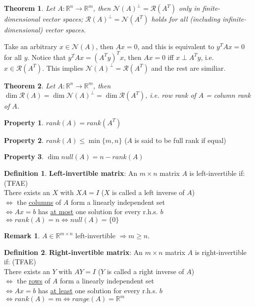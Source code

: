 \documentclass[10pt]{article}
\def\R{\mathbb{R}}
\def\imp{\Rightarrow}
\def\goes{\rightarrow}
\newtheorem{thm}{Theorem}[section]
\theoremstyle{definition}
\newtheorem{defn}{Definition}[section]
\newtheorem{pty}{Property}[section]
\newtheorem{remark}{Remark}[section]
\begin{document}
\begin{thm}
	Let $A: \R^n \goes \R^m$, then $\mathcal{N}(A)^{\perp} = \mathcal{R}(A^T)$ only in finite-dimensional vector spaces;
	$\mathcal{R}(A)^{\perp} = \mathcal{N}(A^T)$ holds for all (including infinite-dimensional) vector spaces.
\end{thm}
\proof
Take an arbitrary $x \in \mathcal{N}(A)$, then $Ax = 0$, and this is equivalent to $y^TAx=0$ for all $y$.
Notice that $y^TAx = (A^Ty)^Tx$, then $Ax = 0$ iff $x \perp A^Ty$, i.e. $x \in \mathcal{R}(A^T)$.
This implies $\mathcal{N}(A)^{\perp} = \mathcal{R}(A^T)$ and the rest are similiar.
\qedhere

\begin{thm}
	Let $A: \R^n \goes \R^m$, then $\dim \mathcal{R}(A) = \dim \mathcal{N}(A)^{\perp} = \dim \mathcal{R}(A^T)$,
	i.e. row rank of $A$ = column rank of $A$.
\end{thm}

\begin{pty}
	$rank(A) = rank(A^T)$
\end{pty}

\begin{pty}
	$rank(A) \le \min\{m,n\}$ ($A$ is said to be full rank if equal)
\end{pty}

\begin{pty}
	$\dim null(A) = n - rank(A)$
\end{pty}


\begin{defn} \textbf{Left-invertible matrix}:
	An $m\times n$ matrix $A$ is left-invertible if: (TFAE)\\
	There exists an $X$ with $XA = I$ ($X$ is called a left inverse of $A$)\\
	$\iff$ the \underline{columns} of $A$ form a linearly independent set\\
	$\iff Ax = b$ has \underline{at most} one solution for every r.h.s. $b$\\
	$\iff rank(A) = n \iff null(A) = \{0\}$
\end{defn}

\begin{remark}
	$A \in \R^{m\times n}$ left-invertible $\imp m \ge n$.
\end{remark}

\begin{defn} \textbf{Right-invertible matrix}:
	An $m\times n$ matrix $A$ is right-invertible if: (TFAE)\\
	There exists an $Y$ with $AY = I$ ($Y$ is called a right inverse of $A$)\\
	$\iff$ the \underline{rows} of $A$ form a linearly independent set\\
	$\iff Ax = b$ has \underline{at least} one solution for every r.h.s. $b$\\
	$\iff rank(A) = m \iff range(A) = \R^m$
\end{defn}
\end{document}
